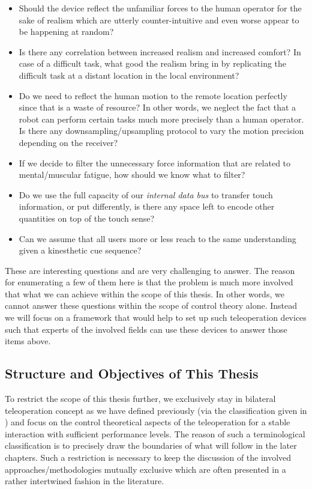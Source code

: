 \begin{itemize}
	\item Should the device reflect the unfamiliar forces to the human operator for the sake of realism which are utterly counter-intuitive and even worse appear to be happening at random? 
    \item Is there any correlation between increased realism and increased comfort? In case of a difficult task, what good the realism bring in by replicating the difficult task at a distant location in the local environment?
    \item Do we need to reflect the human motion to the remote location perfectly since that is a waste of resource? In other words, we neglect the fact that a robot can perform certain tasks much more precisely than a human operator. Is there any downsampling/upsampling protocol to vary the motion precision depending on the receiver?
    \item If we decide to filter the unnecessary force information that are related to mental/muscular fatigue, how should we know what to filter? 
    \item Do we use the full capacity of our \emph{internal data bus} to transfer touch information, or put differently, is there any space left to encode other quantities on top of the touch sense?
    \item Can we assume that all users more or less reach to the same understanding given a kinesthetic cue sequence?
\end{itemize}

These are interesting questions and are very challenging to answer. The reason for enumerating a few of them here is that the problem is much more involved that what we can achieve within the scope of this thesis. In other words, we cannot answer these questions within the scope of control theory alone. Instead we will focus on a framework that would help to set up such teleoperation devices such that experts of the involved fields can use these devices to answer those items above. 



\subsection{Structure and Objectives of This Thesis}
To restrict the scope of this thesis further, we exclusively stay in bilateral teleoperation concept as we have defined previously (via the classification given in ) and focus on the control theoretical aspects of the teleoperation for a stable interaction with sufficient performance levels. The reason of such a terminological classification is to precisely draw the boundaries of what will follow in the later chapters. Such a restriction is necessary to keep the discussion of the involved approaches/methodologies mutually exclusive which are often presented in a rather intertwined fashion in the literature.

